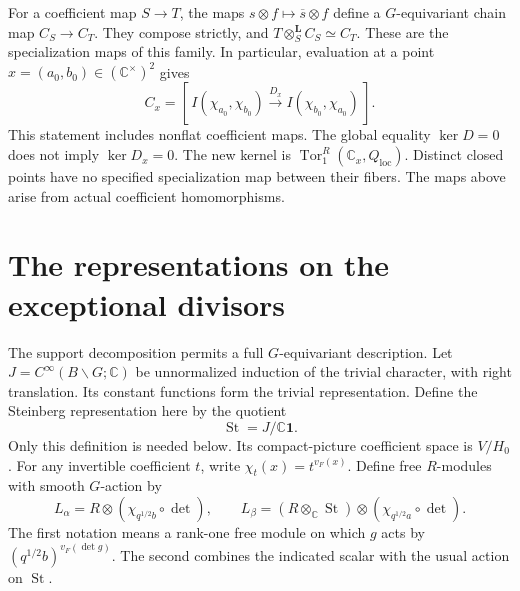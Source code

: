For a coefficient map $S\to T$, the maps $s\otimes f\mapsto\overline s\otimes f$
define a $G$-equivariant chain map $C_S\to C_T$.
They compose strictly, and
$T\otimes_S^{\mathbf L}C_S\simeq C_T$.
These are the specialization maps of this family.
In particular, evaluation at a point $x=(a_0,b_0)\in(\mathbb C^\times)^2$
gives
\[
 C_x=[\,I(\chi_{a_0},\chi_{b_0})
           \xrightarrow{D_x}I(\chi_{b_0},\chi_{a_0})\,].
\]
This statement includes nonflat coefficient maps.
The global equality $\ker D=0$ does not imply $\ker D_x=0$.
The new kernel is $\operatorname{Tor}^R_1(\mathbb C_x,Q_{\mathrm{loc}})$.
Distinct closed points have no specified specialization map between their fibers.
The maps above arise from actual coefficient homomorphisms.

\section{The representations on the exceptional divisors}

The support decomposition permits a full $G$-equivariant description.
Let $J=C^\infty(B\backslash G;\mathbb C)$ be unnormalized induction of the trivial character,
with right translation.
Its constant functions form the trivial representation.
Define the Steinberg representation here by the quotient
\[
 \operatorname{St}=J/\mathbb C\mathbf1.
\]
Only this definition is needed below.
Its compact-picture coefficient space is $V/H_0$.
For any invertible coefficient $t$, write $\chi_t(x)=t^{v_F(x)}$.
Define free $R$-modules with smooth $G$-action by
\[
 L_\alpha=R\otimes(\chi_{q^{1/2}b}\circ\det),\qquad
 L_\beta=(R\otimes_\mathbb C\operatorname{St})\otimes(\chi_{q^{1/2}a}\circ\det).
\]
The first notation means a rank-one free module on which $g$ acts by
$(q^{1/2}b)^{v_F(\det g)}$.
The second combines the indicated scalar with the usual action on $\operatorname{St}$.

